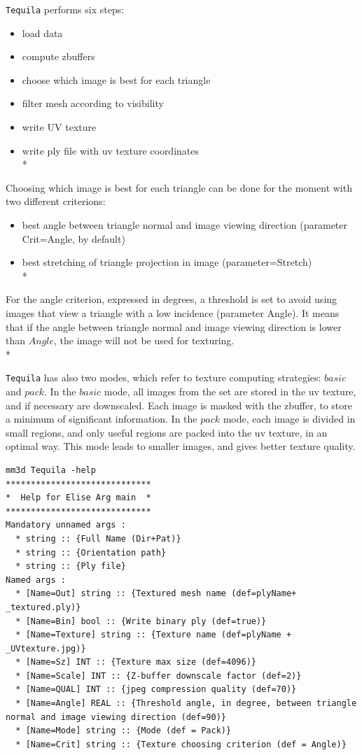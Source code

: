 {\tt Tequila} performs six steps:

\begin{itemize}
    \item load data
    \item compute zbuffers
    \item choose which image is best for each triangle
    \item filter mesh according to visibility
    \item write UV texture
    \item write ply file with uv texture coordinates\\*
\end{itemize}

Choosing which image is best for each triangle can be done for the moment with two different criterions:
\begin{itemize}
\item   best angle between triangle normal and image viewing direction (parameter Crit=Angle, by default)
\item   best stretching of triangle projection in image (parameter=Stretch)\\*
\end{itemize}

For the angle criterion, expressed in degrees, a threshold is set to avoid using images that view a triangle with a low incidence (parameter Angle).
It means that if the angle between triangle normal and image viewing direction is lower than $Angle$, the image will not be used for texturing.\\*

{\tt Tequila} has also two modes, which refer to texture computing strategies: $basic$ and $pack$. In the $basic$ mode, all images from the set are stored in the uv texture, and if necessary are downscaled. Each image is masked with the zbuffer, to store a minimum of significant information.
In the $pack$ mode, each image is divided in small regions, and only useful regions are packed into the uv texture, in an optimal way. This mode leads to smaller images, and gives better texture quality.

\begin{verbatim}
mm3d Tequila -help
*****************************
*  Help for Elise Arg main  *
*****************************
Mandatory unnamed args :
  * string :: {Full Name (Dir+Pat)}
  * string :: {Orientation path}
  * string :: {Ply file}
Named args :
  * [Name=Out] string :: {Textured mesh name (def=plyName+ _textured.ply)}
  * [Name=Bin] bool :: {Write binary ply (def=true)}
  * [Name=Texture] string :: {Texture name (def=plyName + _UVtexture.jpg)}
  * [Name=Sz] INT :: {Texture max size (def=4096)}
  * [Name=Scale] INT :: {Z-buffer downscale factor (def=2)}
  * [Name=QUAL] INT :: {jpeg compression quality (def=70)}
  * [Name=Angle] REAL :: {Threshold angle, in degree, between triangle normal and image viewing direction (def=90)}
  * [Name=Mode] string :: {Mode (def = Pack)}
  * [Name=Crit] string :: {Texture choosing criterion (def = Angle)}
\end{verbatim}

